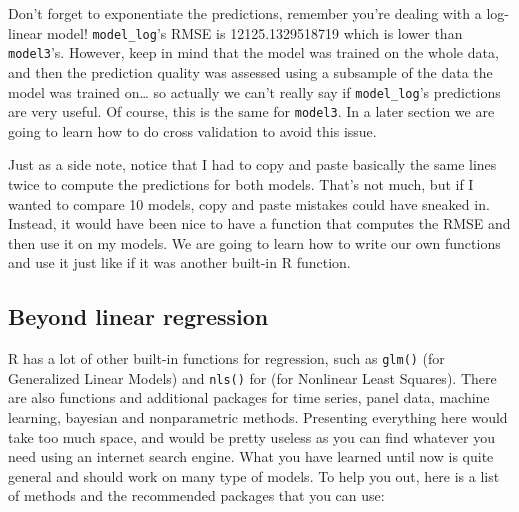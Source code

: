 \documentclass[
]{article}
\begin{document}
Don't forget to exponentiate the predictions, remember you're dealing with a log-linear model! \texttt{model\_log}'s
RMSE is 12125.1329518719 which is lower than \texttt{model3}'s. However, keep in mind that the model was trained
on the whole data, and then the prediction quality was assessed using a subsample of the data the
model was trained on\ldots{} so actually we can't really say if \texttt{model\_log}'s predictions are very useful.
Of course, this is the same for \texttt{model3}.
In a later section we are going to learn how to do cross validation to avoid this issue.

Just as a side note, notice that I had to copy and paste basically the same lines twice to compute
the predictions for both models. That's not much, but if I wanted to compare 10 models, copy and
paste mistakes could have sneaked in. Instead, it would have been nice to have a function that
computes the RMSE and then use it on my models. We are going to learn how to write our own functions
and use it just like if it was another built-in R function.

\hypertarget{beyond-linear-regression}{%
\subsection{Beyond linear regression}\label{beyond-linear-regression}}

R has a lot of other built-in functions for regression, such as \texttt{glm()} (for Generalized Linear
Models) and \texttt{nls()} for (for Nonlinear Least Squares). There are also functions and additional
packages for time series, panel data, machine learning, bayesian and nonparametric methods.
Presenting everything here would take too much space, and would be pretty useless as you can find
whatever you need using an internet search engine. What you have learned until now is quite general
and should work on many type of models. To help you out, here is a list of methods and the
recommended packages that you can use:
\end{document}
